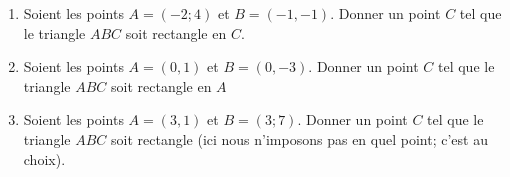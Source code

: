 
\begin{exercice}\label{exoSeconde-0077}

    \begin{enumerate}
        \item
            Soient les points \( A=(-2;4)\) et \( B=(-1,-1)\). Donner un point \( C\) tel que le triangle \( ABC\) soit rectangle en \( C\).
        \item
            Soient les points \( A=(0,1)\) et \( B=(0,-3)\). Donner un point \( C\) tel que le triangle \( ABC\) soit rectangle en \( A\)
        \item
            Soient les points \( A=(3,1)\) et \( B=(3;7)\). Donner un point \( C\) tel que le triangle \( ABC\) soit rectangle (ici nous n'imposons pas en quel point; c'est au choix).
    \end{enumerate}

\end{exercice}
